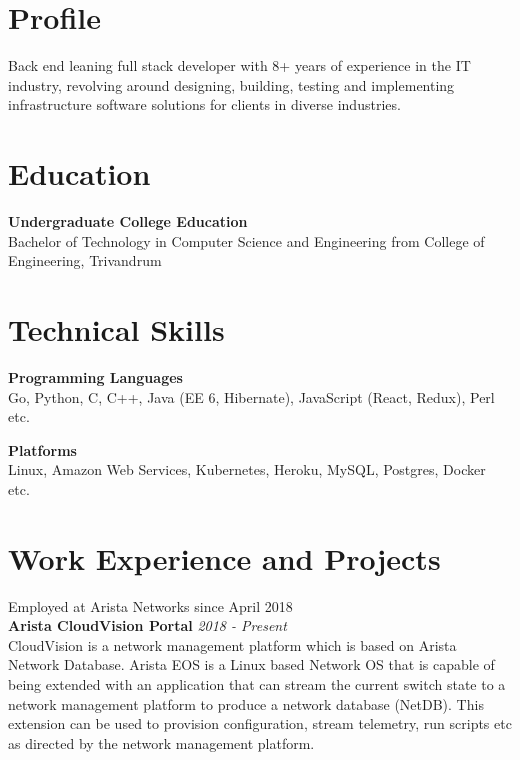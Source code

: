 \documentclass[line,margin]{res}
\begin{document}

\address{jojiantony@yandex.com}
\address{+91 96323 41954}

\begin{resume}

\section{Profile}
Back end leaning full stack developer with 8+ years of experience in the IT industry, revolving around designing, building, testing and implementing infrastructure software solutions for clients in diverse industries.

\section{Education}
{\bf Undergraduate College Education}\\
Bachelor of Technology in Computer Science and Engineering from College of Engineering, Trivandrum\\

\section{Technical Skills}

{\bf Programming Languages}\\
Go, Python, C, C++, Java (EE 6, Hibernate), JavaScript (React, Redux), Perl etc.

{\bf Platforms}\\
Linux, Amazon Web Services, Kubernetes, Heroku, MySQL, Postgres, Docker etc.

\section{Work Experience and Projects}

Employed at Arista Networks since April 2018\\

{\bf Arista CloudVision Portal} \hfill {\it{2018 - Present}}\\

CloudVision is a network management platform which is based on Arista Network Database. Arista EOS is a Linux based Network OS that is capable of being extended with an application that can stream the current switch state to a network management platform to produce a network database (NetDB). This extension can be used to provision configuration, stream telemetry, run scripts etc as directed by the network management platform. 


\end{resume}
\end{document}
